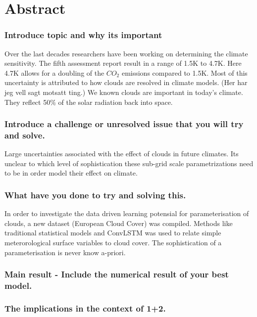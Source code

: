 \chapter*{Abstract}


\subsection*{Introduce topic and why its important}
Over the last decades researchers have been working on determining the climate sensitivity. The fifth assessment report result in a range of 1.5K to 4.7K. Here 4.7K allows for a doubling of the $CO_2$ emissions compared to 1.5K. Most of this uncertainty is attributed to how clouds are resolved in climate models. (Her har jeg vell sagt motsatt ting.) We known clouds are important in today's climate. They reflect 50\% of the solar radiation back into space. %

\subsection*{Introduce a challenge or unresolved issue that you will try and solve.} 
Large uncertainties associated with the effect of clouds in future climates. Its unclear to which level of sophistication these sub-grid scale parametrizations need to be in order model their effect on climate.

\subsection*{What have you done to try and solving this.}
In order to investigate the data driven learning potensial for parameterisation of clouds, a new dataset (European Cloud Cover) was compiled. Methods like traditional statistical models and ConvLSTM was used to relate simple meterorological surface variables to cloud cover. The sophistication of a parameterisation is never know a-priori.

\subsection*{Main result - Include the numerical result of your best model.}

\subsection*{The implications in the context of 1+2.}
\cleardoublepage
